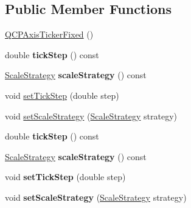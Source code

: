 \subsection*{Public Member Functions}
\begin{DoxyCompactItemize}
\item 
\hyperlink{class_q_c_p_axis_ticker_fixed_a96d2b053a15f9b8e94550c3efeff6a34}{Q\+C\+P\+Axis\+Ticker\+Fixed} ()
\item 
\mbox{\label{class_q_c_p_axis_ticker_fixed_a33d1324c8666b4d5df975dea32ed5a28}} 
double {\bfseries tick\+Step} () const
\item 
\mbox{\label{class_q_c_p_axis_ticker_fixed_a20fd8fcb257f63449f8913335ad57e45}} 
\hyperlink{class_q_c_p_axis_ticker_fixed_a15b3d38b935d404b1311eb85cfb6a439}{Scale\+Strategy} {\bfseries scale\+Strategy} () const
\item 
void \hyperlink{class_q_c_p_axis_ticker_fixed_a4bc83d85a4f81d4abdd3fa5042d7b833}{set\+Tick\+Step} (double step)
\item 
void \hyperlink{class_q_c_p_axis_ticker_fixed_acbc7c9bcd80b3dc3edee5f0519d301f6}{set\+Scale\+Strategy} (\hyperlink{class_q_c_p_axis_ticker_fixed_a15b3d38b935d404b1311eb85cfb6a439}{Scale\+Strategy} strategy)
\item 
\mbox{\label{class_q_c_p_axis_ticker_fixed_a33d1324c8666b4d5df975dea32ed5a28}} 
double {\bfseries tick\+Step} () const
\item 
\mbox{\label{class_q_c_p_axis_ticker_fixed_a20fd8fcb257f63449f8913335ad57e45}} 
\hyperlink{class_q_c_p_axis_ticker_fixed_a15b3d38b935d404b1311eb85cfb6a439}{Scale\+Strategy} {\bfseries scale\+Strategy} () const
\item 
\mbox{\label{class_q_c_p_axis_ticker_fixed_a4bc83d85a4f81d4abdd3fa5042d7b833}} 
void {\bfseries set\+Tick\+Step} (double step)
\item 
\mbox{\label{class_q_c_p_axis_ticker_fixed_acbc7c9bcd80b3dc3edee5f0519d301f6}} 
void {\bfseries set\+Scale\+Strategy} (\hyperlink{class_q_c_p_axis_ticker_fixed_a15b3d38b935d404b1311eb85cfb6a439}{Scale\+Strategy} strategy)
\end{DoxyCompactItemize}
